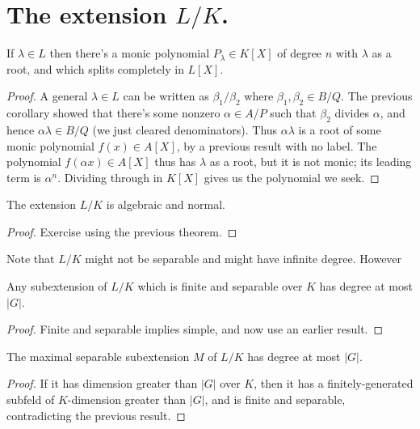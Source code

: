 \section{The extension $L/K$.}

\begin{theorem}
If $\lambda\in L$ then there's a monic polynomial $P_\lambda\in K[X]$ of degree $n$
with $\lambda$ as a root, and which splits completely in $L[X]$.
\end{theorem}
\begin{proof}
  A general $\lambda\in L$ can be written as $\beta_1/\beta_2$ where $\beta_1,\beta_2\in B/Q$.
  The previous corollary showed that there's some nonzero $\alpha\in A/P$ such that $\beta_2$
  divides $\alpha$, and hence $\alpha\lambda\in B/Q$ (we just cleared denominators).
  Thus $\alpha\lambda$ is a root of some monic polynomial $f(x)\in A[X]$,
  by a previous result with no label. The polynomial $f(\alpha x)\in A[X]$ thus
  has $\lambda$ as a root, but it is not monic; its leading term is $\alpha^n$.
  Dividing through in $K[X]$ gives us the polynomial we seek.
\end{proof}

\begin{corollary} The extension $L/K$ is algebraic and normal.
\end{corollary}
\begin{proof} Exercise using the previous theorem.
\end{proof}

Note that $L/K$ might not be separable and might have infinite degree. However

\begin{corollary} Any subextension of $L/K$ which is finite and separable over $K$
  has degree at most $|G|$.
\end{corollary}
\begin{proof}
  Finite and separable implies simple, and now use an earlier result.
\end{proof}

\begin{corollary} The maximal separable subextension $M$ of $L/K$ has degree at most $|G|$.
\end{corollary}
\begin{proof} If it has dimension greater than $|G|$ over $K$, then it has a finitely-generated
  subfeld of $K$-dimension greater than $|G|$, and is finite and separable, contradicting
  the previous result.
\end{proof}

